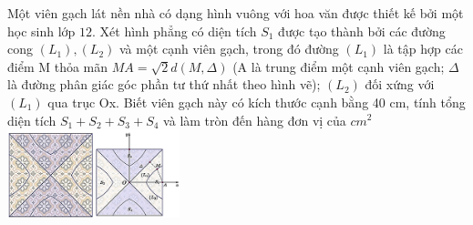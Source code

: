 \begin{ex}%
\immini
{
    Một viên gạch lát nền nhà có dạng hình vuông với hoa văn được thiết kế bởi một học sinh lớp $12$. Xét hình phẳng có diện tích $S_1$ được tạo thành bởi các đường cong $\left(L_1\right),\left(L_2\right)$ và một cạnh viên gạch, trong đó đường $\left(L_1\right)$ là tập hợp các điểm M thỏa mãn $ MA=\sqrt{2}d\left(M,\Delta\right)$ (A là trung điểm một cạnh viên gạch; $\Delta $ là đường phân giác góc phần tư thứ nhất theo hình vẽ); $\left(L_2\right)$ đối xứng với $\left(L_1\right)$ qua trục Ox. Biết viên gạch này có kích thước cạnh bằng 40 cm, tính tổng diện tích $S_1+S_2+S_3+S_4$ và làm tròn đến hàng đơn vị của $ c{m^2}$
}
{
    \includegraphics[width=5cm]{img/HXN-11-20}
}
\end{ex}
